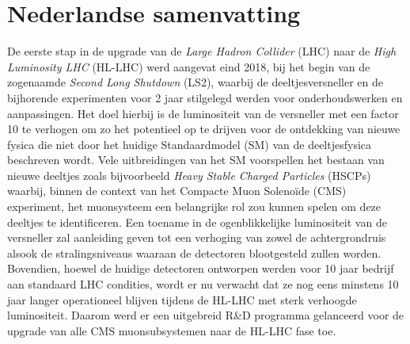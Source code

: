\renewcommand\evenpagerightmark{{\scshape\small Nederlandse Samenvatting}}
\renewcommand\oddpageleftmark{{\scshape\small Dutch Summary}}

\hyphenation{}

\chapter[Nederlandse samenvatting]{Nederlandse samenvatting\\}
\label{samenvatting}

	De eerste stap in de upgrade van de {\it Large Hadron Collider} (LHC) naar de {\it High Luminosity LHC} (HL-LHC) werd aangevat eind 2018, bij het begin van de zogenaamde {\it Second Long Shutdown} (LS2), waarbij de deeltjesversneller en de bijhorende experimenten voor 2 jaar stilgelegd werden voor onderhoudswerken en aanpassingen. Het doel hierbij is de luminositeit van de versneller met een factor 10 te verhogen om zo het potentieel op te drijven voor de ontdekking van nieuwe fysica die niet door het huidige Standaardmodel (SM) van de deeltjesfysica beschreven wordt. Vele uitbreidingen van het SM voorspellen het bestaan van nieuwe deeltjes zoals bijvoorbeeld {\it Heavy Stable Charged Particles} (HSCPs) waarbij, binnen de context van het Compacte Muon Solenoïde (CMS) experiment, het muonsysteem een belangrijke rol zou kunnen spelen om deze deeltjes te identificeren. Een toename in de ogenblikkelijke luminositeit van de versneller zal aanleiding geven tot een verhoging van zowel de achtergrondruis alsook de stralingsniveaus waaraan de detectoren blootgesteld zullen worden. Bovendien, hoewel de huidige detectoren ontworpen werden voor 10 jaar bedrijf aan standaard LHC condities, wordt er nu verwacht dat ze nog eens minstens 10 jaar langer operationeel blijven tijdens de HL-LHC met sterk verhoogde luminositeit. Daarom werd er een uitgebreid R\&D programma gelanceerd voor de upgrade van alle CMS muonsubsystemen naar de HL-LHC fase toe.\\ 
